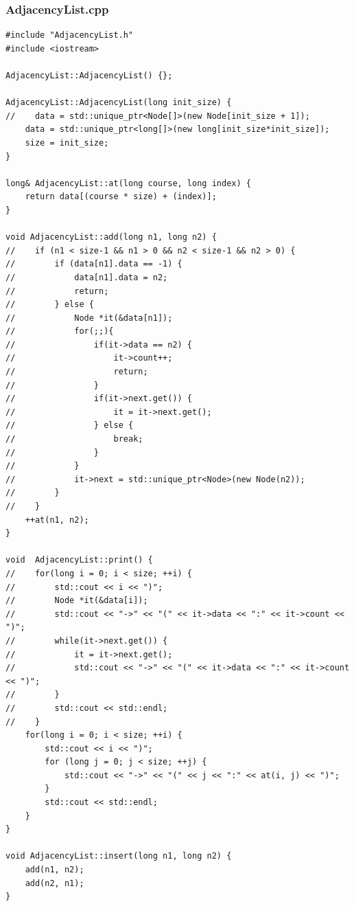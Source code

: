 \documentclass[11pt]{article}
\begin{document}
\subsubsection{AdjacencyList.cpp}
\begin{verbatim}
#include "AdjacencyList.h"
#include <iostream>

AdjacencyList::AdjacencyList() {};

AdjacencyList::AdjacencyList(long init_size) {
//    data = std::unique_ptr<Node[]>(new Node[init_size + 1]);
    data = std::unique_ptr<long[]>(new long[init_size*init_size]);
    size = init_size;
}

long& AdjacencyList::at(long course, long index) {
    return data[(course * size) + (index)];
}

void AdjacencyList::add(long n1, long n2) {
//    if (n1 < size-1 && n1 > 0 && n2 < size-1 && n2 > 0) {
//        if (data[n1].data == -1) {
//            data[n1].data = n2;
//            return;
//        } else {
//            Node *it(&data[n1]);
//            for(;;){
//                if(it->data == n2) {
//                    it->count++;
//                    return;
//                }
//                if(it->next.get()) {
//                    it = it->next.get();
//                } else {
//                    break;
//                }
//            }
//            it->next = std::unique_ptr<Node>(new Node(n2));
//        }
//    }
    ++at(n1, n2);
}

void  AdjacencyList::print() {
//    for(long i = 0; i < size; ++i) {
//        std::cout << i << ")";
//        Node *it(&data[i]);
//        std::cout << "->" << "(" << it->data << ":" << it->count << ")";
//        while(it->next.get()) {
//            it = it->next.get();
//            std::cout << "->" << "(" << it->data << ":" << it->count << ")";
//        }
//        std::cout << std::endl;
//    }
    for(long i = 0; i < size; ++i) {
        std::cout << i << ")";
        for (long j = 0; j < size; ++j) {
            std::cout << "->" << "(" << j << ":" << at(i, j) << ")";
        }
        std::cout << std::endl;
    }
}

void AdjacencyList::insert(long n1, long n2) {
    add(n1, n2);
    add(n2, n1);
}
\end{verbatim}
\end{document}

